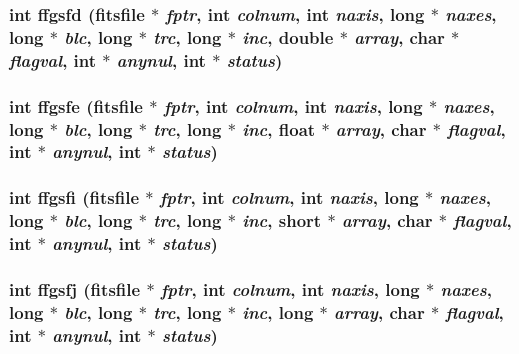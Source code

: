 \subsubsection{\setlength{\rightskip}{0pt plus 5cm}int ffgsfd (\bf{fitsfile} $\ast$ {\em fptr}, int {\em colnum}, int {\em naxis}, long $\ast$ {\em naxes}, long $\ast$ {\em blc}, long $\ast$ {\em trc}, long $\ast$ {\em inc}, double $\ast$ {\em array}, char $\ast$ {\em flagval}, int $\ast$ {\em anynul}, int $\ast$ {\em status})}\label{test_2shm__client_2fitsio_8h_beeb182f75ceb2f94e28d9653b7fd612}


\subsubsection{\setlength{\rightskip}{0pt plus 5cm}int ffgsfe (\bf{fitsfile} $\ast$ {\em fptr}, int {\em colnum}, int {\em naxis}, long $\ast$ {\em naxes}, long $\ast$ {\em blc}, long $\ast$ {\em trc}, long $\ast$ {\em inc}, float $\ast$ {\em array}, char $\ast$ {\em flagval}, int $\ast$ {\em anynul}, int $\ast$ {\em status})}\label{test_2shm__client_2fitsio_8h_a8b0872e27d9bd6b655586b7cbb4ab2a}


\subsubsection{\setlength{\rightskip}{0pt plus 5cm}int ffgsfi (\bf{fitsfile} $\ast$ {\em fptr}, int {\em colnum}, int {\em naxis}, long $\ast$ {\em naxes}, long $\ast$ {\em blc}, long $\ast$ {\em trc}, long $\ast$ {\em inc}, short $\ast$ {\em array}, char $\ast$ {\em flagval}, int $\ast$ {\em anynul}, int $\ast$ {\em status})}\label{test_2shm__client_2fitsio_8h_64fe61a10be1e4a7891e611c2367811a}


\subsubsection{\setlength{\rightskip}{0pt plus 5cm}int ffgsfj (\bf{fitsfile} $\ast$ {\em fptr}, int {\em colnum}, int {\em naxis}, long $\ast$ {\em naxes}, long $\ast$ {\em blc}, long $\ast$ {\em trc}, long $\ast$ {\em inc}, long $\ast$ {\em array}, char $\ast$ {\em flagval}, int $\ast$ {\em anynul}, int $\ast$ {\em status})}\label{test_2shm__client_2fitsio_8h_5fe7f8cf0ec4c375a0d8883974df5e3f}


